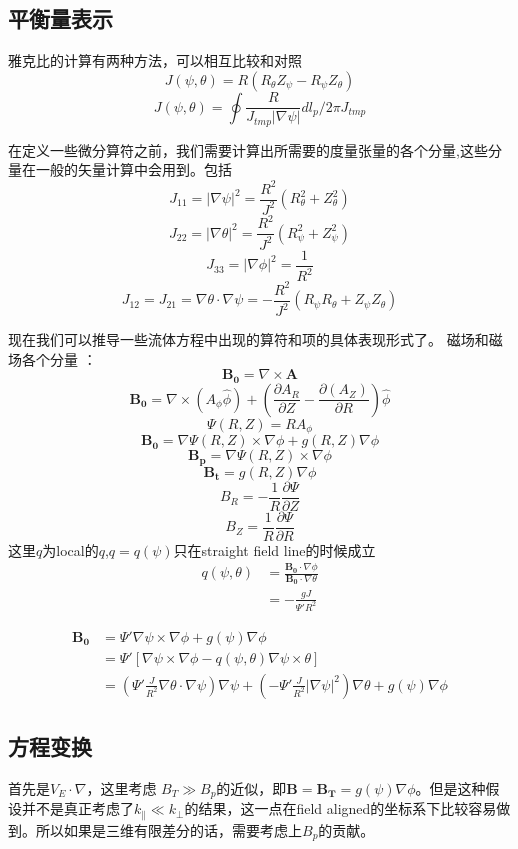 \documentclass[11pt,a4paper]{article}
\begin{document}
\subsection{平衡量表示}
雅克比的计算有两种方法，可以相互比较和对照 
$$J(\psi,\theta) = R(R_\theta Z_\psi-R_\psi Z_\theta)$$ $$J(\psi,\theta) = \oint\frac{R}{J_{tmp}|\nabla\psi|}dl_p/{2\pi} J_{tmp}$$

在定义一些微分算符之前，我们需要计算出所需要的度量张量的各个分量,这些分量在一般的矢量计算中会用到。包括 
$$J_{11} = |\nabla\psi|^2 = \frac{R^2}{J^2}(R_\theta^2 + Z_\theta^2)$$ 
$$J_{22} = |\nabla\theta|^2 = \frac{R^2}{J^2}(R_\psi^2 + Z_\psi^2)$$ $$J_{33} = |\nabla\phi|^2 = \frac{1}{R^2} $$ 
$$J_{12} = J_{21} = \nabla\theta\cdot\nabla\psi = -\frac{R^2}{J^2}(R_\psi R_\theta + Z_\psi Z_\theta) $$

现在我们可以推导一些流体方程中出现的算符和项的具体表现形式了。
磁场和磁场各个分量 ：
$$ \pmb{B_0} = \nabla\times\pmb{A} $$ 
$$ \pmb{B_0} = \nabla\times(A_\phi\hat\phi) + (\frac{\partial{A_R}} {\partial{Z}}-\frac{\partial(A_Z)}{\partial{R}})\hat\phi $$ 
$$ \Psi(R,Z) = RA_\phi $$ 
$$ \pmb{B_0} = \nabla\Psi(R,Z)\times\nabla\phi+g(R,Z)\nabla\phi $$ $$ \pmb{B_p} = \nabla\Psi(R,Z)\times\nabla\phi $$ 
$$ \pmb{B_t} = g(R,Z)\nabla\phi $$ 
$$ B_R = -\frac{1}{R}\frac{\partial\Psi}{\partial{Z}} $$ 
$$ B_Z = \frac{1}{R}\frac{\partial\Psi}{\partial{R}} $$
这里$q$为local的$q$,$q = q(\psi)$只在straight field line的时候成立 
$$ 
\begin{aligned} 
q(\psi,\theta) &=\frac{\pmb{B_0}\cdot\nabla\phi}{\pmb{B_0}\cdot\nabla\theta} \\ 
&= -\frac{gJ}{\Psi'R^2} 
\end{aligned} 
$$

$$ 
\begin{aligned} 
\pmb{B_0} &= \Psi'\nabla\psi\times\nabla\phi + g(\psi)\nabla\phi \\ 
&= \Psi'[\nabla\psi\times\nabla\phi - q(\psi,\theta)\nabla\psi\times\theta] \\ 
&= (\Psi'\frac{J}{R^2}\nabla\theta\cdot\nabla\psi)\nabla\psi + (-\Psi'\frac{J}{R^2}|\nabla\psi|^2)\nabla\theta + g(\psi)\nabla\phi \end{aligned} 
$$



\subsection{方程变换} 
首先是$V_E\cdot\nabla$，这里考虑 $B_T \gg B_p$的近似，即$\pmb{B}=\pmb{B_T}=g(\psi)\nabla\phi$。但是这种假设并不是真正考虑了$k_\parallel\ll k_\perp$的结果，这一点在field aligned的坐标系下比较容易做到。所以如果是三维有限差分的话，需要考虑上$B_p$的贡献。
\end{document}
